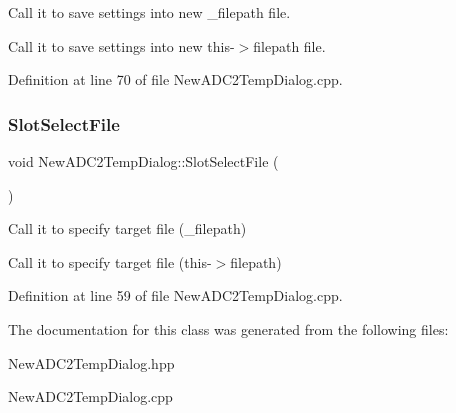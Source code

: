 Call it to save settings into new \+\_\+filepath file. 

Call it to save settings into new this-\/$>$filepath file. 

Definition at line 70 of file New\+A\+D\+C2\+Temp\+Dialog.\+cpp.

\mbox{\label{class_new_a_d_c2_temp_dialog_aecb2c340ccb0c4ceb395ba688c092317}} 
\subsubsection{\texorpdfstring{Slot\+Select\+File}{SlotSelectFile}}
{\footnotesize\ttfamily void New\+A\+D\+C2\+Temp\+Dialog\+::\+Slot\+Select\+File (\begin{DoxyParamCaption}{ }\end{DoxyParamCaption})\hspace{0.3cm}{\ttfamily [slot]}}



Call it to specify target file (\+\_\+filepath) 

Call it to specify target file (this-\/$>$filepath) 

Definition at line 59 of file New\+A\+D\+C2\+Temp\+Dialog.\+cpp.



The documentation for this class was generated from the following files\+:\begin{DoxyCompactItemize}
\item 
New\+A\+D\+C2\+Temp\+Dialog.\+hpp\item 
New\+A\+D\+C2\+Temp\+Dialog.\+cpp\end{DoxyCompactItemize}
